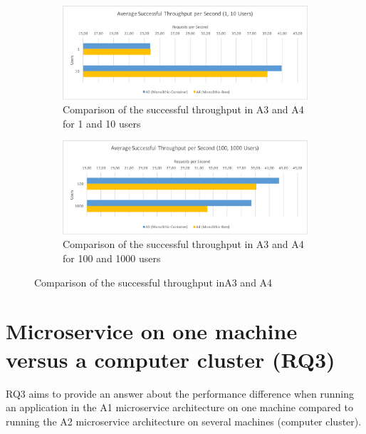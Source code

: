 \documentclass[a4paper,oneside]{bth}
\begin{document}
\begin{figure}[h]
\begin{center}

\begin{subfigure}[b]{1\textwidth}
\includegraphics[width=13cm]{Graph/rq2-stps-1}
\caption{Comparison of the successful throughput in A3 and A4 for 1 and 10 users}
\end{subfigure}

\begin{subfigure}[b]{1\textwidth}
\includegraphics[width=13cm]{Graph/rq2-stps-2}
\caption{Comparison of the successful throughput in A3 and A4 for 100 and 1000 users}
\end{subfigure}

\caption{Comparison of the successful throughput inA3 and A4}
\label{rq2-stps}

\end{center}
\end{figure}


\section{Microservice on one machine versus a computer cluster (RQ3)}
RQ3 aims to provide an answer about the performance difference when running an application in the A1 microservice architecture on one machine compared to running the A2 microservice architecture on several machines (computer cluster).
\end{document}
